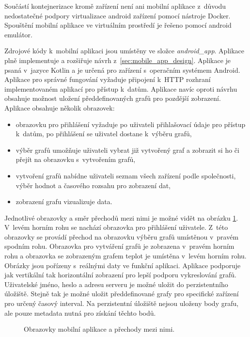 Součástí kontejnerizace kromě zařízení není ani mobilní aplikace z~důvodu nedostatečné podpory virtualizace android zařízení pomocí nástroje Docker. Spouštění mobilní aplikace ve virtuálním prostředí je řešeno pomocí android emulátor.

Zdrojové kódy k~mobilní aplikaci jsou umístěny ve složce \textit{android\_app}. Aplikace plně implementuje a rozšiřuje návrh z~\ref{sec:mobile_app_design}. Aplikace je psaná v~jazyce Kotlin a je určená pro zařízení s~operačním systémem Android. Aplikace pro správné fungování vyžaduje připojení k~HTTP rozhraní implementovaném aplikací pro přístup k~datům. Aplikace navíc oproti návrhu obsahuje možnost uložení předdefinovaných grafů pro pozdější zobrazení. Aplikace obsahuje několik obrazovek: 
\begin{itemize}
    \item obrazovku pro přihlášení vyžaduje po uživateli přihlašovací údaje pro přístup k~datům, po přihlášení se uživatel dostane k~výběru grafů,
    \item výběr grafů umožňuje uživateli vybrat již vytvořený graf a zobrazit si ho či přejít na obrazovku s~vytvořením grafů,
    \item vytvoření grafů nabídne uživateli seznam všech zařízení podle společnosti, výběr hodnot a časového rozsahu pro zobrazení dat,
    \item zobrazení grafu vizualizuje data.
\end{itemize}

Jednotlivé obrazovky a směr přechodů mezi nimi je možné vidět na obrázku \ref{pic:ui_flow}. V~levém horním rohu se nachází obrazovka pro přihlášení uživatele. Z~této obrazovky se provádí přechod na obrazovku výběru grafů umístěnou v~pravém spodním rohu. Obrazovka pro vytváření grafů je zobrazena v~pravém horním rohu a obrazovka se zobrazeným grafem teplot je umístěna v~levém horním rohu. Obrázky jsou pořízeny s~reálnými daty ve funkční aplikaci. Aplikace podporuje jak vertikální tak horizontální zobrazení pro lepší podporu vykreslování grafů. Uživatelské jméno, heslo a adresu serveru je možné uložit do perzistentního úložiště. Stejně tak je možné uložit předdefinované grafy pro specifické zařízení pro určený časový interval. Na perzistentní úložiště nejsou uloženy body grafu, ale pouze metadata nutná pro získání těchto bodů.
\clearpage

\begin{figure}[!h]
  \centering
  \caption{Obrazovky mobilní aplikace a přechody mezi nimi.}\label{pic:ui_flow}
\end{figure}
\clearpage

